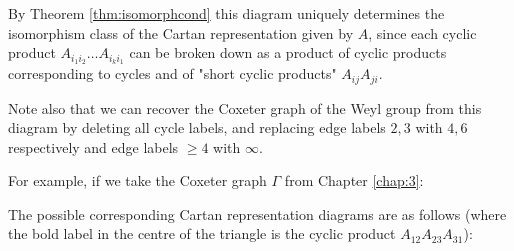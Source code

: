 \documentclass[11pt,a4paper]{report}
\theoremstyle{definition}
\begin{document}
By Theorem \ref{thm:isomorphcond} this diagram uniquely determines the isomorphism class of the Cartan representation given by $A$, since each cyclic product $A_{i_1i_2} \ldots A_{i_ki_1}$ can be broken down as a product of cyclic products corresponding to cycles and of "short cyclic products" $A_{ij} A_{ji}$. 

Note also that we can recover the Coxeter graph of the Weyl group from this diagram by deleting all cycle labels, and replacing edge labels $2, 3$ with $4, 6$ respectively and edge labels $\geq 4$ with $\infty$. 

For example, if we take the Coxeter graph $\Gamma$ from Chapter \ref{chap:3}:

 \begin{figure}[h]
\centering
{}
\end{figure}

The possible corresponding Cartan representation diagrams are as follows (where the bold label in the centre of the triangle is the cyclic product $A_{12} A_{23} A_{31}$):

 \begin{figure}[h]
\centering
{}
\end{figure}


 \begin{figure}[h]
\centering
{}
\end{figure}

 \begin{figure}[h]
\centering
{}
\end{figure}
\end{document}
